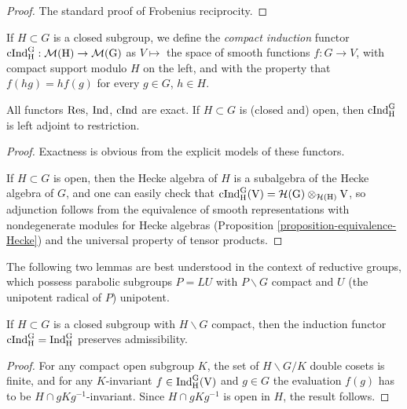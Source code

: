 \begin{proof}
	The standard proof of Frobenius reciprocity.
\end{proof}

\begin{definition}
	\label{definition-compact-induction}
If $H\subset G$ is a closed subgroup, we define the {\it compact induction} functor $\rm{cInd}_H^G: \mathcal M(H)\to \mathcal M(G)$ as $V\mapsto $ the space of smooth functions $f:G\to V$, with compact support modulo $H$ on the left, and with the property that $f(hg) = hf(g)$ for every $g\in G$, $h\in H$.
\end{definition}

\begin{proposition}
	\label{proposition-induction-restriction-exact}
	All functors $\rm{Res}$, $\rm{Ind}$, $\rm{cInd}$ are exact. If $H\subset G$ is (closed and) open, then $\rm{cInd}_H^G$ is left adjoint to restriction. 
\end{proposition}

\begin{proof}
   Exactness is obvious from the explicit models of these functors. 
   
   If $H\subset G$ is open, then the Hecke algebra of $H$ is a subalgebra of the Hecke algebra of $G$, and one can easily check that $\rm{cInd}_H^G(V)=\mathcal H(G)\otimes_{\mathcal H(H)} V$, so adjunction follows from the equivalence of smooth representations with nondegenerate modules for Hecke algebras (Proposition \ref{proposition-equivalence-Hecke}) and the universal property of tensor products.
\end{proof}

The following two lemmas are best understood in the context of reductive groups, which possess parabolic subgroups $P=LU$ with $P\backslash G$ compact and $U$ (the unipotent radical of $P$) unipotent.

\begin{lemma}
	\label{lemma-compact-induction}
	If $H\subset G$ is a closed subgroup with $H\backslash G$ compact, then the induction functor $\rm{cInd}_H^G = \rm{Ind}_H^G$ preserves admissibility. 
\end{lemma}

\begin{proof}
 For any compact open subgroup $K$, the set of $H\backslash G/K$ double cosets is finite, and for any $K$-invariant $f\in \rm{Ind}_H^G(V)$ and $g\in G$ the evaluation $f(g)$ has to be $H\cap gKg^{-1}$-invariant. Since $H\cap gKg^{-1}$ is open in $H$, the result follows.
\end{proof}
	

